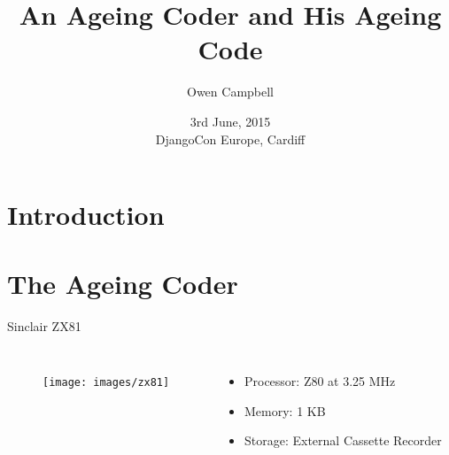 \documentclass{beamer}
\title{An Ageing Coder and His Ageing Code}
\author{Owen Campbell}
\date[DjangoCon Europe 2015]{3rd June, 2015\\DjangoCon Europe, Cardiff}
\begin{document}
\begin{frame}
  \titlepage{}
\end{frame}

\section{Introduction}

\section{The Ageing Coder}

  \begin{frame}{Sinclair ZX81}
    \begin{columns}
        \begin{figure}
          \texttt{[image: images/zx81]}
        \end{figure}
        \begin{itemize}
          \item Processor: Z80 at 3.25 MHz
          \item Memory: 1 KB
          \item Storage: External Cassette Recorder
        \end{itemize}
    \end{columns}
  \end{frame}
\end{document}

